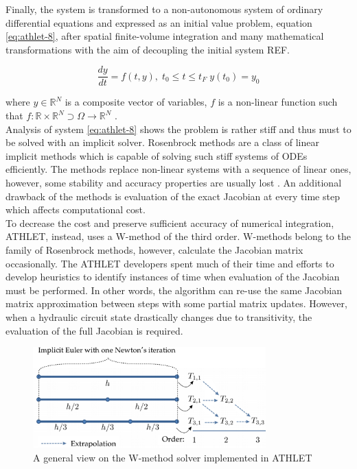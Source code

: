 Finally, the system is transformed to a non-autonomous system of ordinary differential equations and expressed as an initial value problem, equation \ref{eq:athlet-8}, after spatial finite-volume integration and many mathematical transformations with the aim of decoupling the initial system REF. 


\begin{equation} \label{eq:athlet-8}
	\frac{dy}{dt} = f(t,y), \;  t_{0} \leq t \leq t_{F} \; y(t_{0}) = y_{0}
\end{equation}

where $y \in \mathbb{R}^{N}$ is a composite vector of variables, $f$ is a non-linear function such that $f : \mathbb{R} \times \mathbb{R}^{N} \supset \Omega  \rightarrow \mathbb{R}^{N}$  .\\


Analysis of system \ref{eq:athlet-8} shows the problem is rather stiff and thus must to be solved with an implicit solver. Rosenbrock methods are a class of linear implicit methods which is capable of solving such stiff systems of ODEs efficiently. The methods replace non-linear systems with a sequence of linear ones, however, some stability and accuracy properties are usually lost \cite{blom2013rosenbrock}. An additional drawback of the methods is evaluation of the exact Jacobian at every time step which affects computational cost.\\


To decrease the cost and preserve sufficient accuracy of numerical integration, ATHLET, instead, uses a W-method of the third order. W-methods belong to the family of Rosenbrock methods, however, calculate the Jacobian matrix occasionally. The ATHLET developers spent much of their time and efforts to develop heuristics to identify instances of time when evaluation of the Jacobian must be performed. In other words, the algorithm can re-use the same Jacobian matrix approximation between steps with some partial matrix updates. However, when a hydraulic circuit state drastically changes due to transitivity, the evaluation of the full Jacobian is required.\\


\figpointer{\ref{fig:introduction-w-method-scheme}}
\begin{figure}[htpb]
  \centering
  \includegraphics[width=0.8\textwidth]{figures/introduction-rosenbrock-scheme.png}
\caption{A general view on the W-method solver implemented in ATHLET}
\label{fig:introduction-w-method-scheme}
\end{figure}


